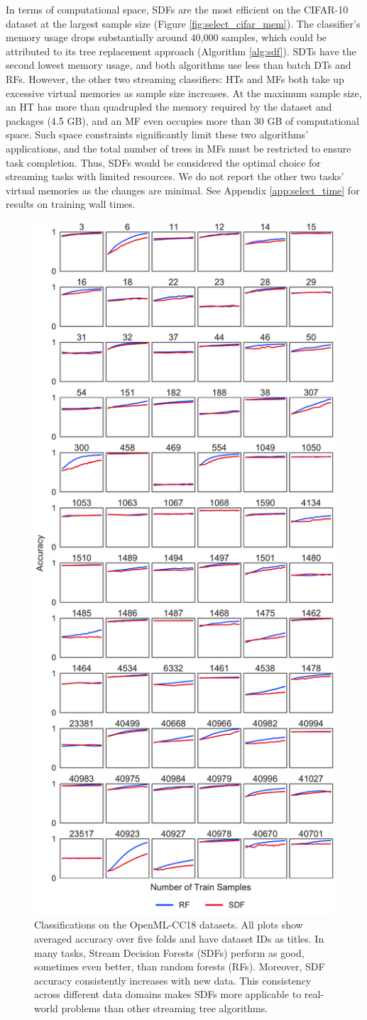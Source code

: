 In terms of computational space, SDFs are the most efficient on the CIFAR-10 dataset at the largest sample size (Figure \ref{fig:select_cifar_mem}). The classifier's memory usage drops substantially around 40,000 samples, which could be attributed to its tree replacement approach (Algorithm \ref{alg:sdf}). SDTs have the second lowest memory usage, and both algorithms use less than batch DTs and RFs. However, the other two streaming classifiers: HTs and MFs both take up excessive virtual memories as sample size increases. At the maximum sample size, an HT has more than quadrupled the memory required by the dataset and packages (4.5 GB), and an MF even occupies more than 30 GB of computational space. Such space constraints significantly limit these two algorithms' applications, and the total number of trees in MFs must be restricted to ensure task completion. 
Thus, SDFs would be considered the optimal choice for streaming tasks with limited resources. We do not report the other two tasks' virtual memories as the changes are minimal. See Appendix \ref{app:select_time} for results on training wall times.

\begin{figure}[!htpb]
\centering
\includegraphics[width=0.5\columnwidth]{cc18}
  \caption{Classifications on the OpenML-CC18 datasets. All plots show averaged accuracy over five folds and have dataset IDs as titles. In many tasks, Stream Decision Forests (SDFs) perform as good, sometimes even better, than random forests (RFs). Moreover, SDF accuracy consistently increases with new data. This consistency across different data domains makes SDFs more applicable to real-world problems than other streaming tree algorithms.
  }
\label{fig:cc18}
\end{figure}

